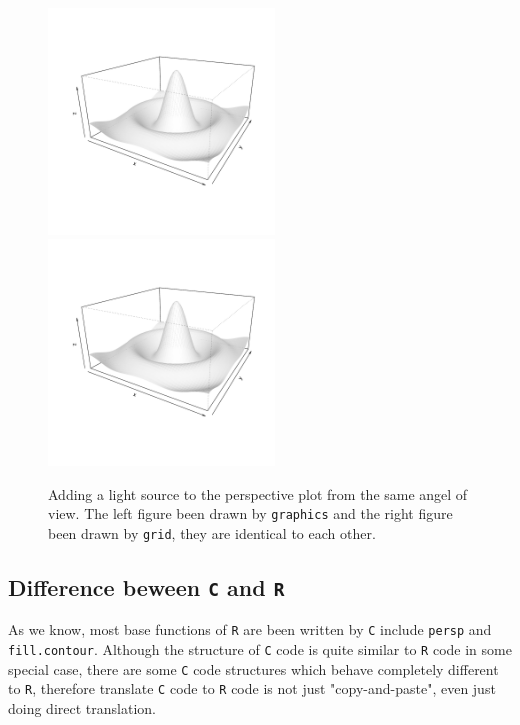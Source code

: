\documentclass[paper=a4, fontsize=11pt]{report}
\begin{document}
\begin{figure}[h]
\begin{center}
  \includegraphics[height = 6cm, width = 6cm]{figure/Lighting_1.pdf}
  \includegraphics[height = 6cm, width = 6cm]{figure/Lighting_2.pdf}
  \caption{Adding a light source to the perspective plot from the same angel of view. The left figure been drawn by \texttt{graphics} and the right figure been drawn by \texttt{grid}, they are identical to each other.}
  	\label{figure7}
\end{center}
\end{figure}

\newpage
\subsection{Difference beween \texttt{C} and \texttt{R}}
As we know, most base functions of \texttt{R} are been written by \texttt{C} include \texttt{persp} and \texttt{fill.contour}. Although the structure of \texttt{C} code is quite similar to \texttt{R} code in some special case, there are some \texttt{C} code structures which behave completely different to \texttt{R}, therefore translate \texttt{C} code to \texttt{R} code is not just "copy-and-paste", even just doing direct translation.\\
\end{document}
